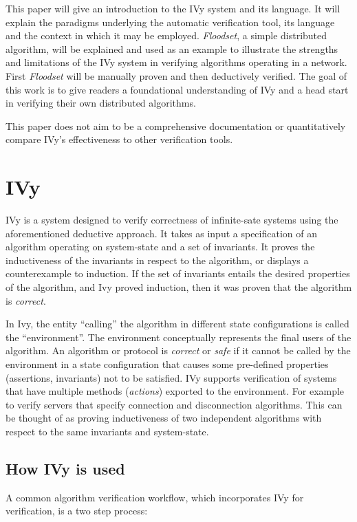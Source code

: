 \documentclass[fleqn]{article}
\begin{document}
  This paper will give an introduction to the IVy system and its language. It will explain the paradigms underlying the automatic verification tool, its language and the context in which it may be employed.  \textit{Floodset}, a simple distributed algorithm, will be explained and used as an example to illustrate the strengths and limitations of the IVy system in verifying algorithms operating in a network. First \textit{Floodset} will be manually proven and then deductively verified.  The goal of this work is to give readers a foundational understanding of IVy and a head start in verifying their own distributed algorithms.

  This paper does not aim to be a comprehensive documentation or quantitatively compare IVy's effectiveness to other verification tools.

\section{IVy}
IVy is a system designed to verify correctness of infinite-sate systems using the aforementioned deductive approach. It takes as input a specification of an algorithm operating on system-state  and a set of invariants. It proves the inductiveness of the invariants in respect to the algorithm, or displays a counterexample to induction. If the set of invariants entails the desired properties of the algorithm, and Ivy proved induction, then it was proven that the algorithm is \textit{correct}.

In Ivy, the entity ``calling'' the algorithm in different state configurations is called the ``environment''. The environment conceptually represents the final users of the algorithm. An algorithm or protocol is \textit{correct} or \textit{safe} if it cannot be called by the environment in a state configuration that causes some pre-defined properties (assertions, invariants) not to be satisfied. IVy supports verification of systems that have multiple methods (\textit{actions}) exported to the environment. For example to verify servers that specify connection and disconnection algorithms. This can be thought of as proving inductiveness of two independent algorithms with respect to the same invariants and system-state.

\subsection{How IVy is used}

A common algorithm verification workflow, which incorporates IVy for verification, is a two step process:
\end{document}
